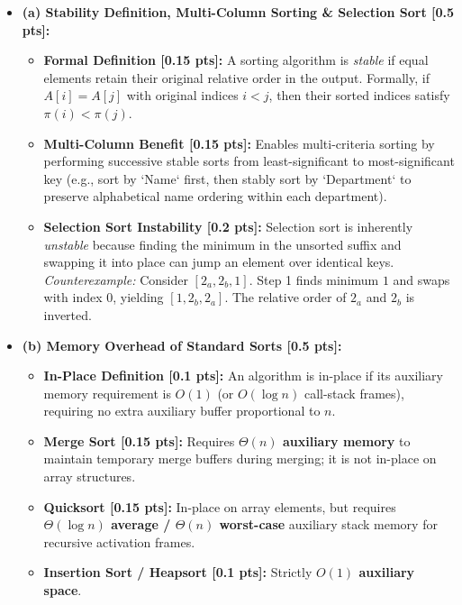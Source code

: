 \documentclass[11pt,a4paper]{article}
\begin{document}
\begin{solutionbox}
\begin{itemize}
    \item \textbf{(a) Stability Definition, Multi-Column Sorting \& Selection Sort [0.5 pts]:}
    \begin{itemize}
        \item \textbf{Formal Definition [0.15 pts]:} A sorting algorithm is \textit{stable} if equal elements retain their original relative order in the output. Formally, if $A[i] = A[j]$ with original indices $i < j$, then their sorted indices satisfy $\pi(i) < \pi(j)$.
        \item \textbf{Multi-Column Benefit [0.15 pts]:} Enables multi-criteria sorting by performing successive stable sorts from least-significant to most-significant key (e.g., sort by `Name` first, then stably sort by `Department` to preserve alphabetical name ordering within each department).
        \item \textbf{Selection Sort Instability [0.2 pts]:} Selection sort is inherently \textit{unstable} because finding the minimum in the unsorted suffix and swapping it into place can jump an element over identical keys.
        \textit{Counterexample:} Consider $[2_a, 2_b, 1]$. Step 1 finds minimum $1$ and swaps with index $0$, yielding $[1, 2_b, 2_a]$. The relative order of $2_a$ and $2_b$ is inverted.
    \end{itemize}
    \item \textbf{(b) Memory Overhead of Standard Sorts [0.5 pts]:}
    \begin{itemize}
        \item \textbf{In-Place Definition [0.1 pts]:} An algorithm is in-place if its auxiliary memory requirement is $O(1)$ (or $O(\log n)$ call-stack frames), requiring no extra auxiliary buffer proportional to $n$.
        \item \textbf{Merge Sort [0.15 pts]:} Requires \textbf{$\Theta(n)$ auxiliary memory} to maintain temporary merge buffers during merging; it is not in-place on array structures.
        \item \textbf{Quicksort [0.15 pts]:} In-place on array elements, but requires \textbf{$\Theta(\log n)$ average / $\Theta(n)$ worst-case} auxiliary stack memory for recursive activation frames.
        \item \textbf{Insertion Sort / Heapsort [0.1 pts]:} Strictly \textbf{$O(1)$ auxiliary space}.
    \end{itemize}
\end{itemize}
\end{solutionbox}
\end{document}
